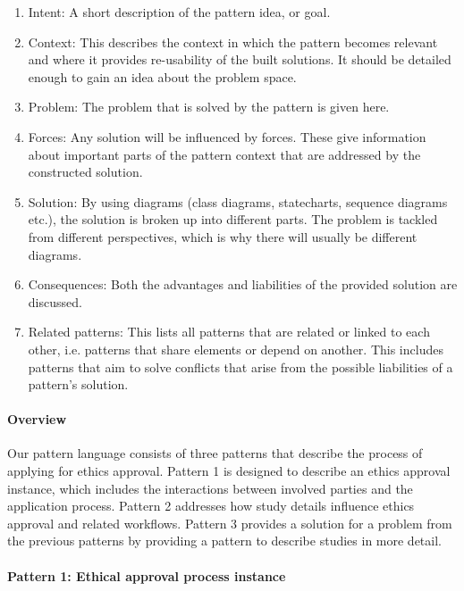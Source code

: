 \documentclass[10pt]{article}
\begin{document}
\begin{enumerate}
\item Intent: A short description of the pattern idea, or goal.
\item Context: This describes the context in which the pattern becomes relevant and where it provides re-usability of the built solutions. It should be detailed enough to gain an idea about the problem space.
\item Problem: The problem that is solved by the pattern is given here. 
\item Forces: Any solution will be influenced by forces. These give information about important parts of the pattern context that are addressed by the constructed solution. 
\item Solution: By using diagrams (class diagrams, statecharts, sequence diagrams etc.), the solution is broken up into different parts. The problem is tackled from different perspectives, which is why there will usually be different diagrams. 
\item Consequences: Both the advantages and liabilities of the provided solution are discussed. 
\item Related patterns: This lists all patterns that are related or linked to each other, i.e. patterns that share elements or depend on another. This includes patterns that aim to solve conflicts that arise from the possible liabilities of a pattern's solution.
\end{enumerate}

\paragraph{Overview}
Our pattern language consists of three patterns that describe the process of applying for ethics approval. Pattern 1 is designed to describe an ethics approval instance, which includes the interactions between involved parties and the application process. Pattern 2 addresses how study details influence ethics approval and related workflows. Pattern 3 provides a solution for a problem from the previous patterns by providing a pattern to describe studies in more detail.

\paragraph{Pattern 1: Ethical approval process instance}
\end{document}
